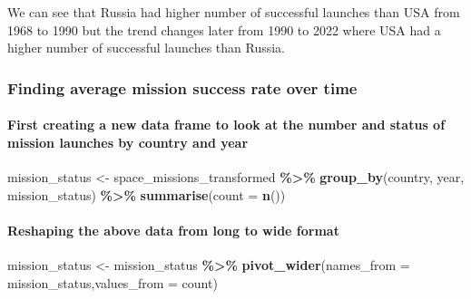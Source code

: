 \documentclass[
]{article}
\newenvironment{Shaded}{\begin{snugshade}}{\end{snugshade}}
\newcommand{\AttributeTok}[1]{\textcolor[rgb]{0.13,0.29,0.53}{#1}}
\newcommand{\FunctionTok}[1]{\textcolor[rgb]{0.13,0.29,0.53}{\textbf{#1}}}
\newcommand{\NormalTok}[1]{#1}
\newcommand{\OtherTok}[1]{\textcolor[rgb]{0.56,0.35,0.01}{#1}}
\newcommand{\SpecialCharTok}[1]{\textcolor[rgb]{0.81,0.36,0.00}{\textbf{#1}}}
\begin{document}
We can see that Russia had higher number of successful launches than USA
from 1968 to 1990 but the trend changes later from 1990 to 2022 where
USA had a higher number of successful launches than Russia.

\hypertarget{finding-average-mission-success-rate-over-time}{%
\subsubsection{Finding average mission success rate over
time}\label{finding-average-mission-success-rate-over-time}}

\hypertarget{first-creating-a-new-data-frame-to-look-at-the-number-and-status-of-mission-launches-by-country-and-year}{%
\paragraph{First creating a new data frame to look at the number and
status of mission launches by country and
year}\label{first-creating-a-new-data-frame-to-look-at-the-number-and-status-of-mission-launches-by-country-and-year}}

\begin{Shaded}
\begin{Highlighting}[]
\NormalTok{mission\_status }\OtherTok{\textless{}{-}}\NormalTok{ space\_missions\_transformed }\SpecialCharTok{\%\textgreater{}\%}
  \FunctionTok{group\_by}\NormalTok{(country, year, mission\_status) }\SpecialCharTok{\%\textgreater{}\%}
  \FunctionTok{summarise}\NormalTok{(}\AttributeTok{count =} \FunctionTok{n}\NormalTok{())}
\end{Highlighting}
\end{Shaded}

\hypertarget{reshaping-the-above-data-from-long-to-wide-format}{%
\paragraph{Reshaping the above data from long to wide
format}\label{reshaping-the-above-data-from-long-to-wide-format}}

\begin{Shaded}
\begin{Highlighting}[]
\NormalTok{mission\_status }\OtherTok{\textless{}{-}}\NormalTok{ mission\_status }\SpecialCharTok{\%\textgreater{}\%}
  \FunctionTok{pivot\_wider}\NormalTok{(}\AttributeTok{names\_from =}\NormalTok{ mission\_status,}\AttributeTok{values\_from =}\NormalTok{ count)}
\end{Highlighting}
\end{Shaded}
\end{document}
